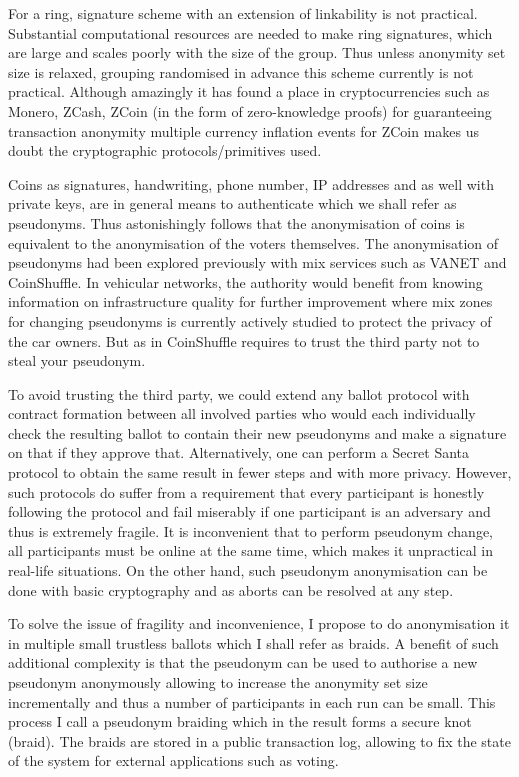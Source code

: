 \documentclass[12pt]{article}
\begin{document}
For a ring, signature scheme with an extension of linkability is not practical. Substantial computational resources are needed to make ring signatures, which are large and scales poorly with the size of the group. Thus unless anonymity set size is relaxed, grouping randomised in advance this scheme currently is not practical. Although amazingly it has found a place in cryptocurrencies such as Monero, ZCash, ZCoin (in the form of zero-knowledge proofs) for guaranteeing transaction anonymity
multiple currency inflation events for ZCoin makes us doubt the cryptographic protocols/primitives used. 

Coins as signatures, handwriting, phone number, IP addresses and as well with private keys, are in general means to authenticate which we shall refer as pseudonyms. Thus astonishingly follows that the anonymisation of coins is equivalent to the anonymisation of the voters themselves. The anonymisation of pseudonyms had been explored previously with mix services such as VANET and CoinShuffle.  In vehicular networks, the authority would benefit from knowing information on infrastructure quality for further improvement where mix zones for changing pseudonyms is currently actively studied to protect the privacy of the car owners. But as in CoinShuffle requires to trust the third party not to steal your pseudonym.

To avoid trusting the third party, we could extend any ballot protocol with contract formation between all involved parties who would each individually check the resulting ballot to contain their new pseudonyms and make a signature on that if they approve that. Alternatively, one can perform a Secret Santa protocol to obtain the same result in fewer steps and with more privacy. However, such protocols do suffer from a requirement that every participant is honestly following the protocol and fail miserably if one participant is an adversary and thus is extremely fragile. It is inconvenient that to perform pseudonym change, all participants must be online at the same time, which makes it unpractical in real-life situations. On the other hand, such pseudonym anonymisation can be done with basic cryptography and as aborts can be resolved at any step.

To solve the issue of fragility and inconvenience, I propose to do anonymisation it in multiple small trustless ballots which I shall refer as braids. A benefit of such additional complexity is that the pseudonym can be used to authorise a new pseudonym anonymously allowing to increase the anonymity set size incrementally and thus a number of participants in each run can be small. This process I call a pseudonym braiding which in the result forms a secure knot (braid). The braids are stored in a public transaction log, allowing to fix the state of the system for external applications such as voting.
\end{document}
